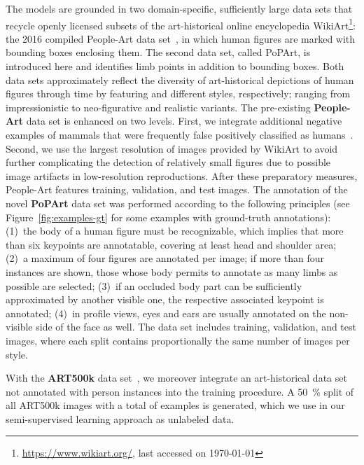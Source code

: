 \documentclass[sigconf]{acmart}
\begin{document}
The models are grounded in two domain-specific, sufficiently large data sets that recycle openly licensed subsets of the art-historical online encyclopedia WikiArt\footnote{\url{https://www.wikiart.org/}, last accessed on \today}: the 2016 compiled People-Art data set~\cite{DBLP:journals/corr/CaiWCH15, DBLP:conf/eccv/WestlakeCH16}, in which human figures are marked with bounding boxes enclosing them. 
The second data set, called \ac{PoPArt}, is introduced here and identifies  limb points in addition to bounding boxes. 
Both data sets approximately reflect the diversity of art-historical depictions of human figures through time by featuring  and  different styles, respectively; ranging from impressionistic to neo-figurative and realistic variants. 
The pre-existing \textbf{People-Art} data set is enhanced on two levels. 
First, we integrate additional negative examples of mammals that were frequently false positively classified as humans~\cite{DBLP:conf/eccv/WestlakeCH16}. 
Second, we use the largest resolution of images provided by WikiArt to avoid further complicating the detection of relatively small figures due to possible image artifacts in low-resolution reproductions. After these preparatory measures, People-Art features  training,  validation, and  test images. 
The annotation of the novel \textbf{\ac{PoPArt}} data set was performed according to the following principles (see Figure~\ref{fig:examples-gt} for some examples with ground-truth annotations): 
(1)~the body of a human figure must be recognizable, which implies that more than six keypoints are annotatable, covering at least head and shoulder area;
(2)~a maximum of four figures are annotated per image; if more than four instances are shown, those whose body permits to annotate as many limbs as possible are selected;
(3)~if an occluded body part can be sufficiently approximated by another visible one, the respective associated keypoint is annotated;
(4)~in profile views, eyes and ears are usually annotated on the non-visible side of the face as well. 
The data set includes  training,  validation, and  test images, where each split contains proportionally the same number of images per style.

With the \textbf{ART500k} data set~\cite{DBLP:conf/mm/MaoCS17}, we moreover integrate an art-historical data set not annotated with person instances into the training procedure. A {\SI{50}{\percent}} split of all ART500k images with a total of  examples is generated, which we use in our semi-supervised learning approach as unlabeled data.
\end{document}
